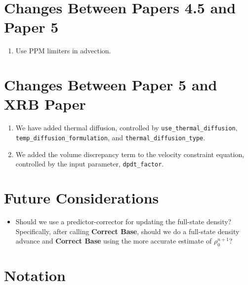 \section{Changes Between Papers 4.5 and Paper 5}
\begin{enumerate}
\item Use PPM limiters in advection.
\end{enumerate}
\section{Changes Between Paper 5 and XRB Paper}
\begin{enumerate}
\item We have added thermal diffusion, controlled by {\tt use\_thermal\_diffusion},
{\tt temp\_diffusion\_formulation}, and {\tt thermal\_diffusion\_type}.
\item We added the volume discrepancy term to the velocity constraint equation,
controlled by the input parameter, {\tt dpdt\_factor}.
\end{enumerate}


\section{Future Considerations}

\begin{itemize}

\item Should we use a predictor-corrector for updating the full-state density?
Specifically, after calling {\bf Correct Base}, should we do a full-state density 
advance and {\bf Correct Base} using the more accurate estimate of $\rho_0^{n+1}$?

\end{itemize}


\section{Notation}


